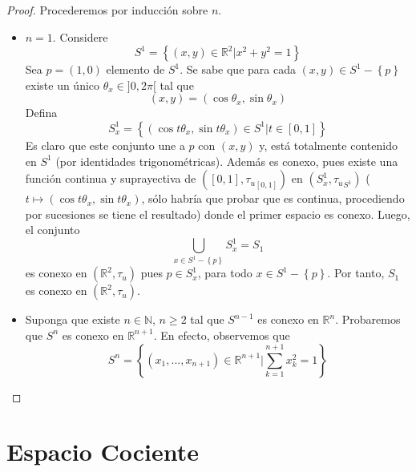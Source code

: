 \documentclass[12pt]{report}
\theoremstyle{largebreak}
\begin{document}
    \begin{proof}
        Procederemos por inducción sobre $n$.
        \begin{itemize}
            \item $n=1$. Considere
            \begin{equation*}
                S^1=\left\{(x,y)\in\mathbb{R}^2\Big|x^2+y^2=1 \right\}
            \end{equation*}
            Sea $p=(1,0)$ elemento de $S^1$. Se sabe que para cada $(x,y)\in S^1-\left\{p\right\}$ existe un único $\theta_x\in]0,2\pi[$ tal que
            \begin{equation*}
                (x,y)=(\cos\theta_x,\sin\theta_x)
            \end{equation*}
            Defina
            \begin{equation*}
                S_x^1=\left\{(\cos t\theta_x,\sin t\theta_x)\in S^1\Big|t\in[0,1]\right\}
            \end{equation*}
            Es claro que este conjunto une a $p$ con $(x,y)$ y, está totalmente contenido en $S^1$ (por identidades trigonométricas). Además es conexo, pues existe una función continua y suprayectiva de $([0,1],{\tau_u}_{[0,1]})$ en $(S_x^1,{\tau_u}_{S^1})$ ($t\mapsto(\cos t\theta_x,\sin t\theta_x)$, sólo habría que probar que es continua, procediendo por sucesiones se tiene el resultado) donde el primer espacio es conexo. Luego, el conjunto
            \begin{equation*}
                \bigcup_{x\in S^1-\left\{p\right\}}S_x^1=S_1
            \end{equation*}
            es conexo en $(\mathbb{R}^2,\tau_u)$ pues $p\in S_x^1$, para todo $x\in S^1-\left\{p\right\}$. Por tanto, $S_1$ es conexo en $(\mathbb{R}^2,\tau_u)$.

            \item Suponga que existe $n\in\mathbb{N}$, $n\geq2$ tal que $S^{n-1}$ es conexo en $\mathbb{R}^n$. Probaremos que $S^n$ es conexo en $\mathbb{R}^{ n+1}$. En efecto, observemos que
            \begin{equation*}
                S^n=\left\{(x_1,...,x_{ n+1})\in\mathbb{R}^{n+1}\Big|\sum_{ k=1}^{n+1}x_k^2=1 \right\}
            \end{equation*}
        \end{itemize}
    \end{proof}

    \section{Espacio Cociente}
\end{document}

